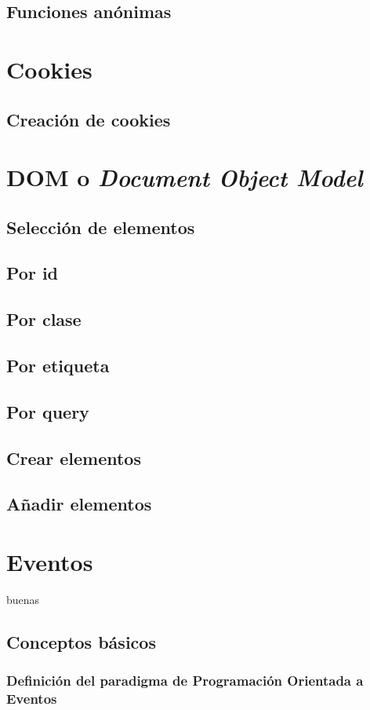\documentclass[12pt]{report}
\begin{document}
		\subsection{Funciones anónimas}
	\section{Cookies}
		\subsection{Creación de cookies}
	\section{DOM o \textit{Document Object Model}}
		\subsection{Selección de elementos}
			\subsection{Por id}
			\subsection{Por clase}
			\subsection{Por etiqueta}
			\subsection{Por query}
		\subsection{Crear elementos}
		\subsection{Añadir elementos}
	\section{Eventos}
		buenas
		\subsection{Conceptos básicos}
			\subsubsection{Definición del paradigma de Programación Orientada a Eventos}
\end{document}
